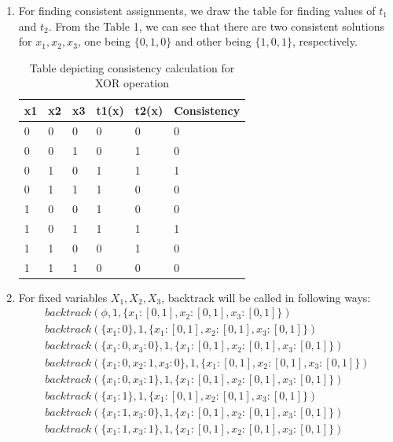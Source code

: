 \documentclass[12pt]{article}
\begin{document}
\begin{enumerate}[label=(\alph*)]
\begin{enumerate}[label=\roman*.]
  \item For finding consistent assignments, we draw the table for finding values of $t_1$ and $t_2$. From the Table 1, we can see that there are two consistent solutions for $x_1, x_2, x_3$, one being $\{0, 1, 0 \}$ and other being $\{ 1, 0, 1\}$, respectively.
  \begin{table}
\centering
\caption{Table depicting consistency calculation for XOR operation}
\begin{tabular}{|l|l|l|l|l|l|} 
\hline
x1 & x2 & x3 & t1(x) & t2(x) & \textbf{Consistency}  \\ 
\hline
0  & 0  & 0  & 0       & 0       & 0                     \\ 
\hline
0  & 0  & 1  & 0       & 1       & 0                     \\ 
\hline
0  & 1  & 0  & 1       & 1       & 1                     \\ 
\hline
0  & 1  & 1  & 1       & 0       & 0                     \\ 
\hline
1  & 0  & 0  & 1       & 0       & 0                     \\ 
\hline
1  & 0  & 1  & 1       & 1       & 1                     \\ 
\hline
1  & 1  & 0  & 0       & 1       & 0                     \\ 
\hline
1  & 1  & 1  & 0       & 0       & 0                     \\
\hline
\end{tabular}
\end{table}
  \item For fixed variables $X_1, X_2, X_3$, backtrack will be called in following ways:
  \begin{align}
  backtrack(\phi, 1, \{x_1: [0, 1], x_2: [0, 1], x_3: [0,1]\}) \\
  backtrack(\{x_1: 0\}, 1, \{x_1: [0, 1], x_2: [0, 1], x_3: [0,1]\}) \\
  backtrack(\{x_1: 0, x_3: 0\}, 1, \{x_1: [0, 1], x_2: [0, 1], x_3: [0,1]\}) \\
  backtrack(\{x_1: 0, x_2: 1, x_3: 0\}, 1, \{x_1: [0, 1], x_2: [0, 1], x_3: [0,1]\}) \\
  backtrack(\{x_1: 0, x_3: 1\}, 1, \{x_1: [0, 1], x_2: [0, 1], x_3: [0,1]\}) \\
  backtrack(\{x_1: 1\}, 1, \{x_1: [0, 1], x_2: [0, 1], x_3: [0,1]\}) \\
  backtrack(\{x_1: 1, x_3: 0\}, 1, \{x_1: [0, 1], x_2: [0, 1], x_3: [0,1]\}) \\
  backtrack(\{x_1: 1, x_3: 1\}, 1, \{x_1: [0, 1], x_2: [0, 1], x_3: [0,1]\}) \\

\end{align}
\end{enumerate}
\end{enumerate}
\end{document}
